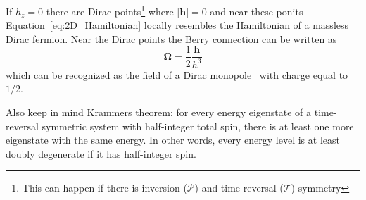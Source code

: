 If $h_z=0$ there are Dirac points\footnote{This can happen if there is inversion ($\mathcal{P}$) and time reversal ($\mathcal{T}$) symmetry} where $\vert\mathbf{h}\vert=0$ and near these ponits Equation~\ref{eq:2D_Hamiltonian} locally resembles the Hamiltonian of a massless Dirac fermion. Near the Dirac points the Berry connection can be written as
%
\begin{equation}
	\mathbf{\Omega}=\frac{1}{2}\frac{\mathbf{h}}{h^3}
\end{equation}
%
which can be recognized as the field of a Dirac monopole~\cite{dirac_paul_adrien_maurice_quantised_1931} with charge equal to $1/2$.


Also keep in mind Krammers theorem: for every energy eigenstate of a time-reversal symmetric system with half-integer total spin, there is at least one more eigenstate with the same energy. In other words, every energy level is at least doubly degenerate if it has half-integer spin.

 


     







%

